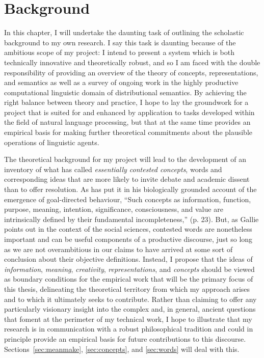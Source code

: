 \chapter{Background} \label{chap:background}
In this chapter, I will undertake the daunting task of outlining the scholastic background to my own research.  I say this task is daunting because of the ambitious scope of my project: I intend to present a system which is both technically innovative and theoretically robust, and so I am faced with the double responsibility of providing an overview of the theory of concepts, representations, and semantics as well as a survey of ongoing work in the highly productive computational linguistic domain of distributional semantics.  By achieving the right balance between theory and practice, I hope to lay the groundwork for a project that is suited for and enhanced by application to tasks developed within the field of natural language processing, but that at the same time provides an empirical basis for making further theoretical commitments about the plausible operations of linguistic agents.

The theoretical background for my project will lead to the development of an inventory of what \cite{Gallie1956} has called \emph{essentially contested concepts}, words and corresponding ideas that are more likely to invite debate and academic dissent than to offer resolution.  As \cite{Deacon2011} has put it in his biologically grounded account of the emergence of goal-directed behaviour, ``Such concepts as information, function, purpose, meaning, intention, significance, consciousness, and value are intrinsically defined by their fundamental incompleteness,'' (p. 23).  But, as Gallie points out in the context of the social sciences, contested words are nonetheless important and can be useful components of a productive discourse, just so long as we are not overambitious in our claims to have arrived at some sort of conclusion about their objective definitions.  Instead, I propose that the ideas of \emph{information}, \emph{meaning}, \emph{creativity}, \emph{representations}, and \emph{concepts} should be viewed as boundary conditions for the empirical work that will be the primary focus of this thesis, delineating the theoretical territory from which my approach arises and to which it ultimately seeks to contribute.  Rather than claiming to offer any particularly visionary insight into the complex and, in general, ancient questions that foment at the perimeter of my technical work, I hope to illustrate that my research is in communication with a robust philosophical tradition and could in principle provide an empirical basis for future contributions to this discourse.  Sections~\ref{sec:meanmake}, \ref{sec:concepts}, and \ref{sec:words} will deal with this.

